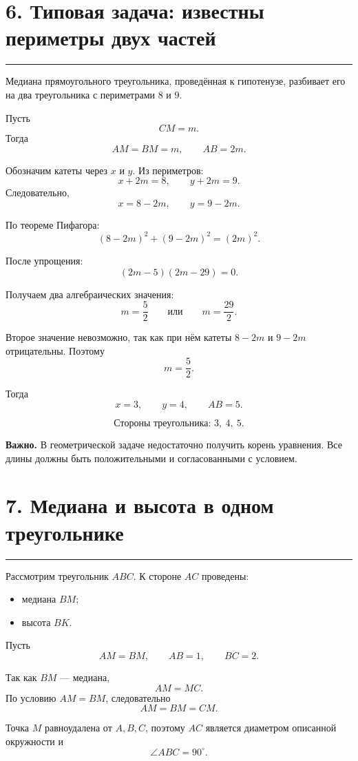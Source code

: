 \documentclass[a4paper,12pt]{article}
\newcommand{\key}[1]{\textcolor{darkaccent}{\textbf{#1}}}
\newcommand{\sectionrule}{%
  \par\vspace{-0.35em}%
  {\color{accent!60}\rule{\linewidth}{0.7pt}}%
  \vspace{0.35em}
}
\begin{document}
\section*{\textcolor{darkaccent}{6. Типовая задача: известны периметры двух частей}}
\sectionrule

Медиана прямоугольного треугольника, проведённая к гипотенузе,
разбивает его на два треугольника с периметрами \(8\) и \(9\).

Пусть
\[
CM=m.
\]
Тогда
\[
AM=BM=m,\qquad AB=2m.
\]

Обозначим катеты через \(x\) и \(y\). Из периметров:
\[
x+2m=8,
\qquad
y+2m=9.
\]
Следовательно,
\[
x=8-2m,
\qquad
y=9-2m.
\]

По теореме Пифагора:
\[
(8-2m)^2+(9-2m)^2=(2m)^2.
\]

После упрощения:
\[
(2m-5)(2m-29)=0.
\]

Получаем два алгебраических значения:
\[
m=\frac52
\qquad\text{или}\qquad
m=\frac{29}{2}.
\]

Второе значение невозможно, так как при нём катеты
\(8-2m\) и \(9-2m\) отрицательны. Поэтому
\[
m=\frac52.
\]

Тогда
\[
x=3,\qquad y=4,\qquad AB=5.
\]

\[
\boxed{\text{Стороны треугольника: }3,\ 4,\ 5.}
\]

\key{Важно.}
В геометрической задаче недостаточно получить корень уравнения.
Все длины должны быть положительными и согласованными с условием.

\section*{\textcolor{darkaccent}{7. Медиана и высота в одном треугольнике}}
\sectionrule

Рассмотрим треугольник \(ABC\). К стороне \(AC\) проведены:

\begin{itemize}
  \item медиана \(BM\);
  \item высота \(BK\).
\end{itemize}

Пусть
\[
AM=BM,\qquad AB=1,\qquad BC=2.
\]

Так как \(BM\) --- медиана,
\[
AM=MC.
\]
По условию \(AM=BM\), следовательно
\[
AM=BM=CM.
\]

Точка \(M\) равноудалена от \(A,B,C\), поэтому \(AC\) является диаметром
описанной окружности и
\[
\angle ABC=90^\circ.
\]
\end{document}
